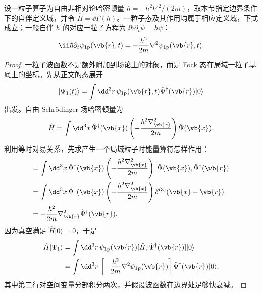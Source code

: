 \begin{proposition}[二次量子化在一粒子空间上的限制]
设一粒子算子为自由非相对论哈密顿量 $h=-\hbar^2\nabla^2/(2m)$，取本节指定边界条件下的自伴定义域，并令 $\hat H=\dd\Gamma(h)$。一粒子态及其作用均属于相应定义域，下式成立；一般自伴 $h$ 的对应一粒子方程为 $\ii\hbar\partial_t\psi=h\psi$：
\begin{equation}
 {
 \ii\hbar\partial_t\psi_{\rm 1p}(\vb{r},t)
 =-\frac{\hbar^2}{2m}\nabla^2\psi_{\rm 1p}(\vb{r},t).}
\label{eq:fock-oneparticle-schrodinger-dp68}
\end{equation}
\end{proposition}
\begin{proof}
一粒子波函数不是额外附加到场论上的对象，而是 Fock 态在局域一粒子基底上的坐标。先从正文的态展开
\begin{equation*}
|\Psi_1(t)\rangle
=\int\dd^3r\,\psi_{\rm 1p}(\vb{r},t)
\hat\Psi^\dagger(\vb{r})|0\rangle
\end{equation*}
出发。自由 Schr\"odinger 场哈密顿量为
\begin{equation*}
\hat H
=\int\dd^3x\,
\hat\Psi^\dagger(\vb{x})
\left(-\frac{\hbar^2\nabla_{\vb{x}}^2}{2m}\right)
\hat\Psi(\vb{x}).
\end{equation*}
利用等时对易关系，先求产生一个局域粒子时能量算符怎样作用：
\begin{align*}
[\hat H,\hat\Psi^\dagger(\vb{r})]
&=\int\dd^3x\,
\hat\Psi^\dagger(\vb{x})
\left(-\frac{\hbar^2\nabla_{\vb{x}}^2}{2m}\right)
[\hat\Psi(\vb{x}),\hat\Psi^\dagger(\vb{r})]\\
&=\int\dd^3x\,
\hat\Psi^\dagger(\vb{x})
\left(-\frac{\hbar^2\nabla_{\vb{x}}^2}{2m}\right)
\delta^{(3)}(\vb{x}-\vb{r})\\
&=-\frac{\hbar^2}{2m}\nabla_{\vb{r}}^2
\hat\Psi^\dagger(\vb{r}).
\end{align*}
因为真空满足 \(\hat H|0\rangle=0\)，于是
\begin{align*}
\hat H|\Psi_1\rangle
&=\int\dd^3r\,\psi_{\rm 1p}(\vb{r})
[\hat H,\hat\Psi^\dagger(\vb{r})]|0\rangle\\
&=\int\dd^3r\,
\left[-\frac{\hbar^2}{2m}\nabla^2\psi_{\rm 1p}(\vb{r})\right]
\hat\Psi^\dagger(\vb{r})|0\rangle,
\end{align*}
其中第二行对空间变量分部积分两次，并假设波函数在边界处足够快衰减。


\end{proof}
